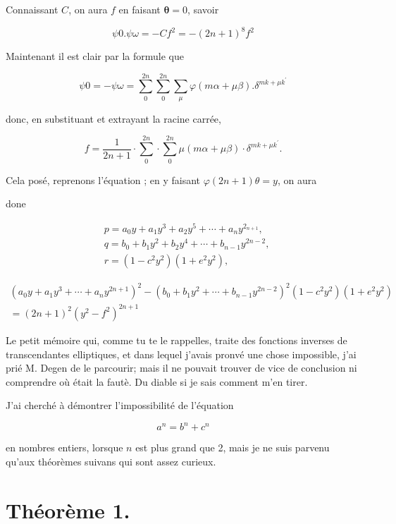 \documentclass{article}
\begin{document}
Connaissant \(C\), on aura \(f\) en faisant \(\boldsymbol{\theta}=0\), savoir

\[
\psi 0 . \psi \omega=-C f^{2}=-(2 n+1)^{8} f^{2}
\]

Maintenant il est clair par la formule que

\[
\psi 0=-\psi \omega=\sum_{0}^{2 n} \sum_{0}^{2 n} \sum_{\mu} \varphi(m \alpha+\mu \beta) . \delta^{m k+\mu k^{\prime}}
\]

donc, en substituant et extrayant la racine carrée,

\[
f=\frac{1}{2 n+1} \cdot \sum_{0}^{2 n} \cdot \sum_{0}^{2 n} \mu(m \alpha+\mu \beta) \cdot \delta^{m k+\mu k^{\prime}} .
\]

Cela posé, reprenons l'équation ; en y faisant \(\varphi(2 n+1) \theta=y\), on aura

done

\[
\begin{aligned}
& p=a_{0} y+a_{1} y^{3}+a_{2} y^{5}+\cdots+a_{n} y^{2_{n+1}}, \\
& q=b_{0}+b_{1} y^{2}+b_{2} y^{4}+\cdots+b_{n-1} y^{2 n-2}, \\
& r=\left(1-c^{2} y^{2}\right)\left(1+e^{2} y^{2}\right),
\end{aligned}
\]

\[
\begin{gathered}
\left(a_{0} y+a_{1} y^{3}+\cdots+a_{n} y^{2 n+1}\right)^{2}-\left(b_{0}+b_{1} y^{2}+\cdots+b_{n-1} y^{2 n-2}\right)^{2}\left(1-c^{2} y^{2}\right)\left(1+e^{2} y^{2}\right) \\
=(2 n+1)^{2}\left(y^{2}-f^{2}\right)^{2 n+1}
\end{gathered}
\]

Le petit mémoire qui, comme tu te le rappelles, traite des fonctions inverses de transcendantes elliptiques, et dans lequel j'avais pronvé une chose impossible, j'ai prié M. Degen de le parcourir; mais il ne pouvait trouver de vice de conclusion ni comprendre où était la fautè. Du diable si je sais comment m'en tirer.

J'ai cherché à démontrer l'impossibilité de l'équation

\[
a^{n}=b^{n}+c^{n}
\]

en nombres entiers, lorsque \(n\) est plus grand que 2, mais je ne suis parvenu qu'aux théorèmes suivans qui sont assez curieux.

\section*{Théorème 1.}
\end{document}
